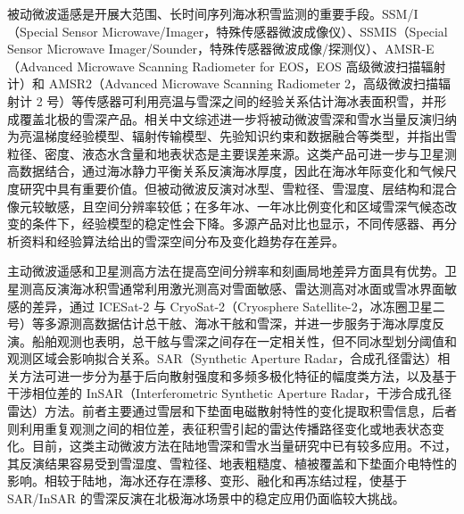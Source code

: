 被动微波遥感是开展大范围、长时间序列海冰积雪监测的重要手段。SSM/I（Special Sensor Microwave/Imager，特殊传感器微波成像仪）、SSMIS（Special Sensor Microwave Imager/Sounder，特殊传感器微波成像/探测仪）、AMSR-E（Advanced Microwave Scanning Radiometer for EOS，EOS 高级微波扫描辐射计）和 AMSR2（Advanced Microwave Scanning Radiometer 2，高级微波扫描辐射计 2 号）等传感器可利用亮温与雪深之间的经验关系估计海冰表面积雪，并形成覆盖北极的雪深产品\citep{markus_cavalieri1998,comiso2003,markus2006}。相关中文综述进一步将被动微波雪深和雪水当量反演归纳为亮温梯度经验模型、辐射传输模型、先验知识约束和数据融合等类型，并指出雪粒径、密度、液态水含量和地表状态是主要误差来源\citep{sunzhiwen2015passive,xiaoxiongxin2018passive}。这类产品可进一步与卫星测高数据结合，通过海冰静力平衡关系反演海冰厚度，因此在海冰年际变化和气候尺度研究中具有重要价值\citep{zwally2008,kurtz2009}。但被动微波反演对冰型、雪粒径、雪湿度、层结构和混合像元较敏感，且空间分辨率较低；在多年冰、一年冰比例变化和区域雪深气候态改变的条件下，经验模型的稳定性会下降\citep{rostosky2018,markus_cavalieri2011,cavalieri2012,castro_morales2017}。多源产品对比也显示，不同传感器、再分析资料和经验算法给出的雪深空间分布及变化趋势存在差异\citep{lee2015,lee2021,zhou2021}。

主动微波遥感和卫星测高方法在提高空间分辨率和刻画局地差异方面具有优势。卫星测高反演海冰积雪通常利用激光测高对雪面敏感、雷达测高对冰面或雪冰界面敏感的差异，通过 ICESat-2 与 CryoSat-2（Cryosphere Satellite-2，冰冻圈卫星二号）等多源测高数据估计总干舷、海冰干舷和雪深，并进一步服务于海冰厚度反演\citep{kwok_kurtz2017,kwok_markus2018,kacimi_kwok2020,kacimi_kwok2022}。船舶观测也表明，总干舷与雪深之间存在一定相关性，但不同冰型划分阈值和观测区域会影响拟合关系\citep{worby2011,steer2016}。SAR（Synthetic Aperture Radar，合成孔径雷达）相关方法可进一步分为基于后向散射强度和多频多极化特征的幅度类方法，以及基于干涉相位差的 InSAR（Interferometric Synthetic Aperture Radar，干涉合成孔径雷达）方法。前者主要通过雪层和下垫面电磁散射特性的变化提取积雪信息，后者则利用重复观测之间的相位差，表征积雪引起的雷达传播路径变化或地表状态变化。目前，这类主动微波方法在陆地雪深和雪水当量研究中已有较多应用\citep{shi_dozier2000a,tedesco_kim2006,yu2022,hans2022,guneriussen2001,lihui2014,mahmoodzada2020}。不过，其反演结果容易受到雪湿度、雪粒径、地表粗糙度、植被覆盖和下垫面介电特性的影响。相较于陆地，海冰还存在漂移、变形、融化和再冻结过程，使基于 SAR/InSAR 的雪深反演在北极海冰场景中的稳定应用仍面临较大挑战。

